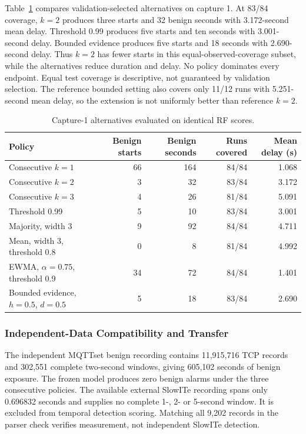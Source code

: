 \documentclass[conference]{IEEEtran}
\begin{document}
Table~\ref{tab:alternatives} compares validation-selected alternatives
on capture 1. At 83/84 coverage, $k=2$ produces three starts and 32
benign seconds with 3.172-second mean delay. Threshold 0.99 produces
five starts and ten seconds with 3.001-second delay. Bounded evidence
produces five starts and 18 seconds with 2.690-second delay. Thus $k=2$
has fewer starts in this equal-observed-coverage subset, while the
alternatives reduce duration and delay. No policy dominates every
endpoint. Equal test coverage is descriptive, not guaranteed by
validation selection. The reference bounded setting also covers only
11/12 runs with 5.251-second mean delay, so the extension is not
uniformly better than reference $k=2$.

\begin{table}[t]
\centering
\caption{Capture-1 alternatives evaluated on identical RF scores.}
\label{tab:alternatives}
\begin{tabularx}{\textwidth}{>{\raggedright\arraybackslash}Xrrrr}
\toprule
Policy & Benign starts & Benign seconds & Runs covered & Mean delay (s) \\
\midrule
Consecutive $k=1$ & 66 & 164 & 84/84 & 1.068 \\
Consecutive $k=2$ & 3 & 32 & 83/84 & 3.172 \\
Consecutive $k=3$ & 4 & 26 & 81/84 & 5.091 \\
Threshold 0.99 & 5 & 10 & 83/84 & 3.001 \\
Majority, width 3 & 9 & 92 & 84/84 & 4.711 \\
Mean, width 3, threshold 0.8 & 0 & 8 & 81/84 & 4.992 \\
EWMA, $\alpha=0.75$, threshold 0.9 & 34 & 72 & 84/84 & 1.401 \\
Bounded evidence, $h=0.5$, $d=0.5$ & 5 & 18 & 83/84 & 2.690 \\
\bottomrule
\end{tabularx}
\end{table}

\subsubsection{Independent-Data Compatibility and Transfer}

The independent MQTTset benign recording contains 11,915,716 TCP
records and 302,551 complete two-second windows, giving 605,102 seconds
of benign exposure. The frozen model produces zero benign alarms
under the three consecutive policies. The available external SlowITe
recording spans only 0.696832 seconds and supplies no complete 1-, 2-
or 5-second window. It is excluded from temporal detection scoring.
Matching all 9,202 records in the parser check verifies measurement,
not independent SlowITe detection.
\end{document}
